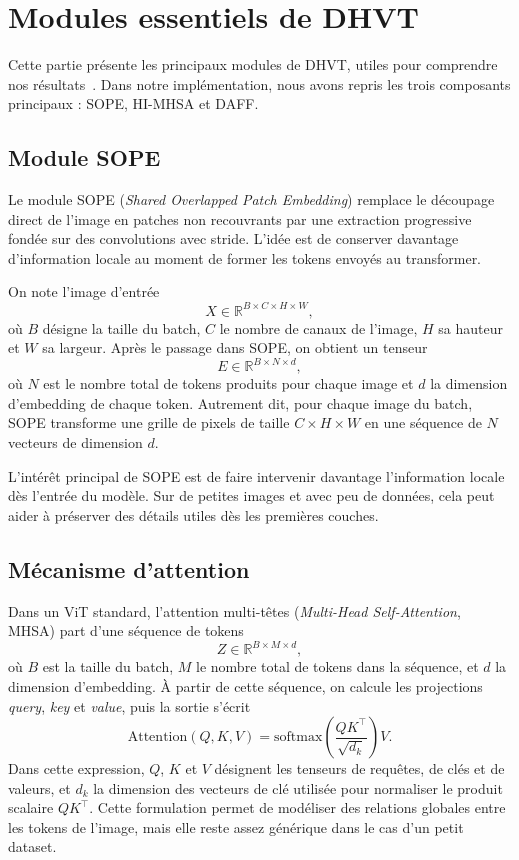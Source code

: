\documentclass[11pt,a4paper]{article}
\begin{document}
\section{Modules essentiels de DHVT}
Cette partie pr\'esente les principaux modules de DHVT, utiles pour comprendre nos r\'esultats~\cite{dhvt}. Dans notre impl\'ementation, nous avons repris les trois composants principaux : SOPE, HI-MHSA et DAFF. 

\subsection{Module SOPE}
\label{subsec:sope}
Le module SOPE (\textit{Shared Overlapped Patch Embedding}) remplace le d\'ecoupage direct de l'image en patches non recouvrants par une extraction progressive fond\'ee sur des convolutions avec stride. L'id\'ee est de conserver davantage d'information locale au moment de former les tokens envoy\'es au transformer.

On note l'image d'entr\'ee
\[
X \in \mathbb{R}^{B \times C \times H \times W},
\]
o\`u $B$ d\'esigne la taille du batch, $C$ le nombre de canaux de l'image, $H$ sa hauteur et $W$ sa largeur. Apr\`es le passage dans SOPE, on obtient un tenseur
\[
E \in \mathbb{R}^{B \times N \times d},
\]
o\`u $N$ est le nombre total de tokens produits pour chaque image et $d$ la dimension d'embedding de chaque token. Autrement dit, pour chaque image du batch, SOPE transforme une grille de pixels de taille $C \times H \times W$ en une s\'equence de $N$ vecteurs de dimension $d$.

L'int\'er\^et principal de SOPE est de faire intervenir davantage l'information locale d\`es l'entr\'ee du mod\`ele. Sur de petites images et avec peu de donn\'ees, cela peut aider \`a pr\'eserver des d\'etails utiles d\`es les premi\`eres couches.

\subsection{M\'ecanisme d'attention}
\label{subsec:himhsa}
Dans un ViT standard, l'attention multi-t\^etes (\textit{Multi-Head Self-Attention}, MHSA) part d'une s\'equence de tokens
\[
Z \in \mathbb{R}^{B \times M \times d},
\]
o\`u $B$ est la taille du batch, $M$ le nombre total de tokens dans la s\'equence, et $d$ la dimension d'embedding. \`A partir de cette s\'equence, on calcule les projections \textit{query}, \textit{key} et \textit{value}, puis la sortie s'\'ecrit
\[
\mathrm{Attention}(Q,K,V)=\mathrm{softmax}\left(\frac{QK^\top}{\sqrt{d_k}}\right)V.
\]
Dans cette expression, $Q$, $K$ et $V$ d\'esignent les tenseurs de requ\^etes, de cl\'es et de valeurs, et $d_k$ la dimension des vecteurs de cl\'e utilis\'ee pour normaliser le produit scalaire $QK^\top$. Cette formulation permet de mod\'eliser des relations globales entre les tokens de l'image, mais elle reste assez g\'en\'erique dans le cas d'un petit dataset.
\end{document}

